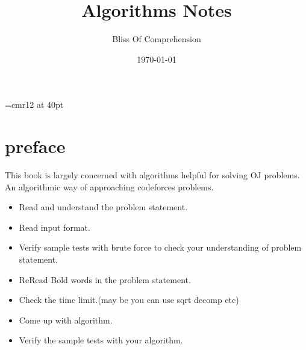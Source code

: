 \documentclass[a4paper,12pt]{report}
\begin{document}
\font\TitleF=cmr12 at 40pt
\title{\TitleF Algorithms Notes}
\author{Bliss Of Comprehension}
\date{\today}
\maketitle

\tableofcontents

\chapter*{preface}

This book is largely concerned with algorithms helpful for solving OJ problems.\\
An algorithmic way of approaching codeforces problems.
\begin{itemize}
	\item Read and understand the problem statement.
	\item Read input format.
	\item Verify sample tests with brute force to check your understanding of problem statement.
	\item ReRead Bold words in the problem statement.
	\item Check the time limit.(may be you can use sqrt decomp etc)
	\item Come up with algorithm.
	\item Verify the sample tests with your algorithm.
\end{itemize}









\end{document}
